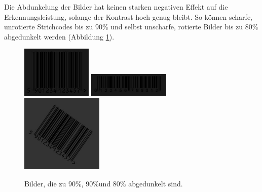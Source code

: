 Die Abdunkelung der Bilder hat keinen starken negativen Effekt auf die Erkennungsleistung, solange der Kontrast hoch genug bleibt. So können scharfe, unrotierte Strichcodes bis zu 90\% und selbst unscharfe, rotierte Bilder bis zu 80\% abgedunkelt werden (Abbildung \ref*{fig:eandark}).
\begin{figure}[H]
  \centering
  \includegraphics[width=0.30\textwidth]{img/EAN13/dark_01_90.jpg}
  \includegraphics[width=0.35\textwidth]{img/EAN13/dark_02_90.jpg}
  \includegraphics[width=0.35\textwidth]{img/EAN13/blurrydarkrotate_01_07_80_35.jpg}
  \caption{Bilder, die zu 90\%, 90\%und 80\% abgedunkelt sind.}
  \label{fig:eandark}
\end{figure}

